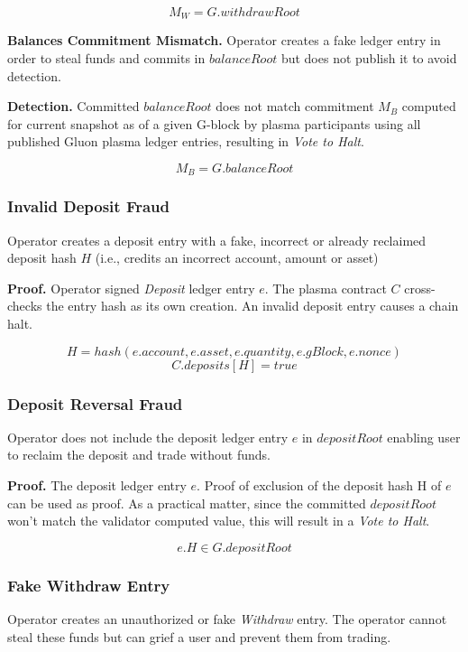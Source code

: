 \documentclass[12pt,a4paper]{article}
\begin{document}
\begin{equation}
M_W = G.withdrawRoot
\end{equation}

\textbf{Balances Commitment Mismatch.} Operator creates a fake ledger entry in order to steal funds and commits in $balanceRoot$ but does not publish it to avoid detection.

\textbf{Detection.} Committed $balanceRoot$ does not match commitment $M_B$ computed for current snapshot as of a given G-block by plasma participants using all published Gluon plasma ledger entries, resulting in \emph{Vote to Halt}.

\begin{equation}
M_B = G.balanceRoot
\end{equation}

\subsubsection{Invalid Deposit Fraud}\label{fp:idf}
Operator creates a deposit entry with a fake, incorrect or already reclaimed deposit hash $H$ (i.e., credits an incorrect account, amount or asset) 

\textbf{Proof.} 
Operator signed \emph{Deposit} ledger entry $e$. The plasma contract $C$ cross-checks the entry hash as its own creation. An invalid deposit entry causes a chain halt.

    \[ H = hash(e.account, e.asset, e.quantity, e.gBlock, e.nonce) \]
    \begin{equation}
    C.deposits[H] = true
    \end{equation}


\subsubsection{Deposit Reversal Fraud}\label{fp:drf}
Operator does not include the deposit ledger entry $e$ in $depositRoot$ enabling user to reclaim the deposit and trade without funds. 

\textbf{Proof.} The deposit ledger entry $e$. Proof of exclusion of the deposit hash H of $e$ can be used as proof. As a practical matter, since the committed $depositRoot$ won't match the validator computed value, this will result in a \emph{Vote to Halt}.

\begin{equation}
    e.H \in G.depositRoot
\end{equation}

\subsubsection{Fake Withdraw Entry} \label{fp:fwe}
Operator creates an unauthorized or fake \emph{Withdraw} entry. The operator cannot steal these funds but can grief a user and prevent them from trading. 
\end{document}
